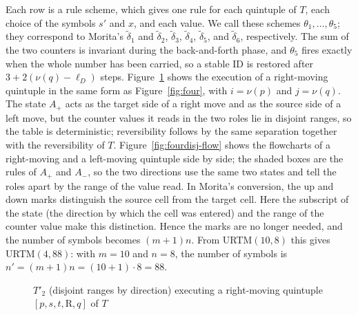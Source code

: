 \documentclass{article}
\theoremstyle{definition}
\theoremstyle{remark}
\begin{document}
Each row is a rule scheme, which gives one rule for each quintuple of $T$, each choice of the symbols $s'$ and $x$, and each value. We call these schemes $\theta_1,\dots,\theta_5$; they correspond to Morita's $\tilde\delta_1$ and $\tilde\delta_2$, $\tilde\delta_3$, $\tilde\delta_4$, $\tilde\delta_5$, and $\tilde\delta_6$, respectively.
The sum of the two counters is invariant during the back-and-forth phase, and $\theta_5$ fires exactly when the whole number has been carried, so a stable ID is restored after $3+2(\nu(q)-\ell_D)$ steps.
Figure~\ref{fig:fourdisj} shows the execution of a right-moving quintuple in the same form as Figure~\ref{fig:four}, with $i=\nu(p)$ and $j=\nu(q)$.
The state $A_+$ acts as the target side of a right move and as the source side of a left move, but the counter values it reads in the two roles lie in disjoint ranges, so the table is deterministic; reversibility follows by the same separation together with the reversibility of $T$.
Figure~\ref{fig:fourdisj-flow} shows the flowcharts of a right-moving and a left-moving quintuple side by side; the shaded boxes are the rules of $A_+$ and $A_-$, so the two directions use the same two states and tell the roles apart by the range of the value read.
In Morita's conversion, the up and down marks distinguish the source cell from the target cell. Here the subscript of the state (the direction by which the cell was entered) and the range of the counter value make this distinction.
Hence the marks are no longer needed, and the number of symbols becomes $(m+1)n$.
From URTM$(10,8)$ this gives URTM$(4,88)$: with $m=10$ and $n=8$, the number of symbols is $n'=(m+1)n=(10+1)\cdot 8=88$.
\begin{figure}[tb]
\centering
{}
\caption{$T'_2$ (disjoint ranges by direction) executing a right-moving quintuple $[p,s,t,\mathrm{R},q]$ of $T$}
\label{fig:fourdisj}
\end{figure}
\end{document}
